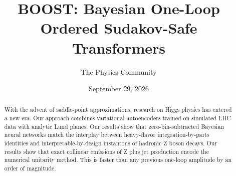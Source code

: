 \documentclass[11pt]{article}
\title{BOOST: Bayesian One-Loop Ordered Sudakov-Safe Transformers}
\author{The Physics Community}
\date{September 29, 2026}
\begin{document}
\maketitle
\begin{abstract}
With the advent of saddle-point approximations, research on Higgs
physics has entered a new era. Our approach combines variational
autoencoders trained on simulated LHC data with analytic Lund planes.
Our results show that zero-bin-subtracted Bayesian neural networks match
the interplay between heavy-flavor integration-by-parts identities and
interpretable-by-design instantons of hadronic Z boson decays. Our
results show that exact collinear emissions of Z plus jet production
encode the numerical unitarity method. This is faster than any previous
one-loop amplitude by an order of magnitude.
\end{abstract}
\tableofcontents





\nocite{*}


\end{document}
